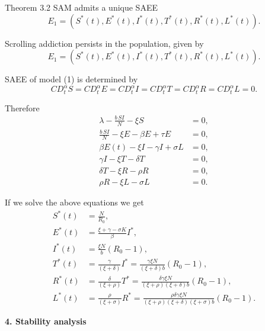 \documentclass[10pt]{NSP1}
\begin{document}
	Theorem 3.2 SAM admits a unique SAEE
	\[
	E_{1} = \left(S^{*}(t),E^{*}(t),I^{*}(t),T^{*}(t),R^{*}(t),L^{*}(t)\right). \tag{3.15}
	\]
	
	\par\vspace{14.0pt}\vspace{14.0pt}
	
	Scrolling addiction persists in the population, given by
	\[
	E_{1} = \left(S^{*}(t),E^{*}(t),I^{*}(t),T^{*}(t),R^{*}(t),L^{*}(t)\right).
	\]
	
	SAEE of model (1) is determined by
	\[
	CD_{t}^{\alpha} S = CD_{t}^{\alpha} E = CD_{t}^{\alpha} I = CD_{t}^{\alpha} T = CD_{t}^{\alpha} R = CD_{t}^{\alpha} L = 0. \tag{3.16}
	\]
	
	Therefore
	\[
	\begin{aligned}
		\lambda - \frac{b\,S I}{N} - \xi S &= 0,\\
		\frac{b\,S I}{N} - \xi E - \beta E + \tau E &= 0,\\
		\beta E(t) - \xi I - \gamma I + \sigma L &= 0,\\
		\gamma I - \xi T - \delta T &= 0,\\
		\delta T - \xi R - \rho R &= 0,\\
		\rho R - \xi L - \sigma L &= 0.
	\end{aligned} \tag{3.17}
	\]
	
	If we solve the above equations we get
	\[
	\begin{aligned}
		S^{*}(t) &= \frac{N}{R_{0}},\\
		E^{*}(t) &= \frac{\xi + \gamma - \sigma K}{\beta} I^{*},\\
		I^{*}(t) &= \frac{\xi N}{b}(R_{0} - 1),\\
		T^{*}(t) &= \frac{\gamma}{(\xi + \delta)} I^{*} = \frac{\gamma\xi N}{(\xi + \delta)b}(R_{0} - 1),\\
		R^{*}(t) &= \frac{\delta}{(\xi + \rho)}T^{*} = \frac{\delta\gamma\xi N}{(\xi + \rho)(\xi + \delta)b}(R_{0} - 1),\\
		L^{*}(t) &= \frac{\rho}{(\xi + \sigma)} R^{*} = \frac{\rho\delta\gamma\xi N}{(\xi + \rho)(\xi + \delta)(\xi + \sigma)b}(R_{0} - 1).
	\end{aligned} \tag{3.18}
	\]
	
	\par\vspace{14.0pt}\noindent \begin{center}\large\bfseries 4. Stability analysis\end{center}\vspace{14.0pt}
	
\end{document}
